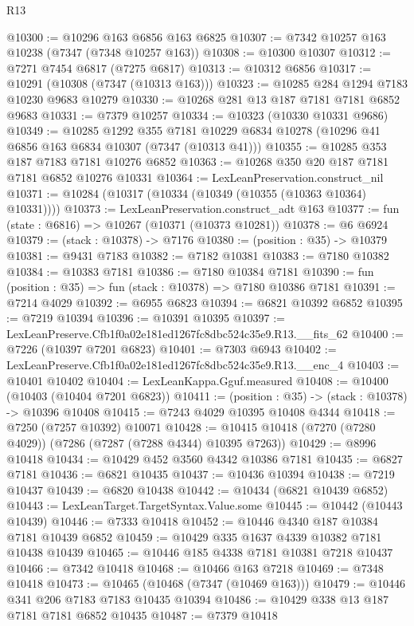 \begin{lexlean}{R13}
\begin{coremodule}
@10300 := @10296 @163 @6856 @163 @6825
@10307 := @7342 @10257 @163 @10238 (@7347 (@7348 @10257 @163))
@10308 := @10300 @10307
@10312 := @7271 @7454 @6817 (@7275 @6817)
@10313 := @10312 @6856
@10317 := @10291 (@10308 (@7347 (@10313 @163)))
@10323 := @10285 @284 @1294 @7183 @10230 @9683 @10279
@10330 := @10268 @281 @13 @187 @7181 @7181 @6852 @9683
@10331 := @7379 @10257
@10334 := @10323 (@10330 @10331 @9686)
@10349 := @10285
    @1292
    @355
    @7181
    @10229
    @6834
    @10278
    (@10296 @41 @6856 @163 @6834 @10307 (@7347 (@10313 @41)))
@10355 := @10285 @353 @187 @7183 @7181 @10276 @6852
@10363 := @10268 @350 @20 @187 @7181 @7181 @6852 @10276 @10331
@10364 := LexLeanPreservation.construct_nil
@10371 := @10284 (@10317 (@10334 (@10349 (@10355 (@10363 @10364) @10331))))
@10373 := LexLeanPreservation.construct_adt @163
@10377 := fun (state : @6816) => @10267 (@10371 (@10373 @10281))
@10378 := @6 @6924
@10379 := (stack : @10378) -> @7176
@10380 := (position : @35) -> @10379
@10381 := @9431 @7183
@10382 := @7182 @10381
@10383 := @7180 @10382
@10384 := @10383 @7181
@10386 := @7180 @10384 @7181
@10390 := fun (position : @35) => fun (stack : @10378) => @7180 @10386 @7181
@10391 := @7214 @4029
@10392 := @6955 @6823
@10394 := @6821 @10392 @6852
@10395 := @7219 @10394
@10396 := @10391 @10395
@10397 := LexLeanPreserve.Cfb1f0a02e181ed1267fc8dbc524c35e9.R13.__fits_62
@10400 := @7226 (@10397 @7201 @6823)
@10401 := @7303 @6943
@10402 := LexLeanPreserve.Cfb1f0a02e181ed1267fc8dbc524c35e9.R13.__enc_4
@10403 := @10401 @10402
@10404 := LexLeanKappa.Gguf.measured
@10408 := @10400 (@10403 (@10404 @7201 @6823))
@10411 := (position : @35) -> (stack : @10378) -> @10396 @10408
@10415 := @7243 @4029 @10395 @10408 @4344
@10418 := @7250 (@7257 @10392) @10071
@10428 := @10415 @10418 (@7270 (@7280 @4029)) (@7286 (@7287 (@7288 @4344) @10395 @7263))
@10429 := @8996 @10418
@10434 := @10429 @452 @3560 @4342 @10386 @7181
@10435 := @6827 @7181
@10436 := @6821 @10435
@10437 := @10436 @10394
@10438 := @7219 @10437
@10439 := @6820 @10438
@10442 := @10434 (@6821 @10439 @6852)
@10443 := LexLeanTarget.TargetSyntax.Value.some
@10445 := @10442 (@10443 @10439)
@10446 := @7333 @10418
@10452 := @10446 @4340 @187 @10384 @7181 @10439 @6852
@10459 := @10429 @335 @1637 @4339 @10382 @7181 @10438 @10439
@10465 := @10446 @185 @4338 @7181 @10381 @7218 @10437
@10466 := @7342 @10418
@10468 := @10466 @163 @7218
@10469 := @7348 @10418
@10473 := @10465 (@10468 (@7347 (@10469 @163)))
@10479 := @10446 @341 @206 @7183 @7183 @10435 @10394
@10486 := @10429 @338 @13 @187 @7181 @7181 @6852 @10435
@10487 := @7379 @10418

\end{coremodule}
\end{lexlean}
